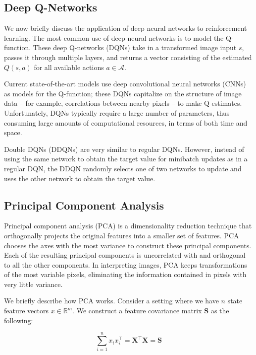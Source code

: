 \documentclass[11pt]{article}
\begin{document}
\subsection{Deep Q-Networks}

We now briefly discuss the application of deep neural networks to reinforcement learning. The most common use of deep neural networks is to model the Q-function. These deep Q-networks (DQNs) take in a transformed image input $s$, passes it through multiple layers, and returns a vector consisting of the estimated $Q(s, a)$ for all available actions $a \in \mathcal{A}$. 

Current state-of-the-art models \cite{mnih2013playing, mnih2015human} use deep convolutional neural networks (CNNs) as models for the Q-function; these DQNs capitalize on the structure of image data -- for example, correlations between nearby pixels -- to make Q estimates. Unfortunately, DQNs typically require a large number of parameters, thus consuming large amounts of computational resources, in terms of both time and space.

Double DQNs (DDQNs) \cite{van2016deep} are very similar to regular DQNs. However, instead of using the same network to obtain the target value for minibatch updates as in a regular DQN, the DDQN randomly selects one of two networks to update and uses the other network to obtain the target value.


\subsection{Principal Component Analysis}

Principal component analysis (PCA) is a dimensionality reduction technique that orthogonally projects the original features into a smaller set of features. PCA chooses the axes with the most variance to construct these principal components. Each of the resulting principal components is uncorrelated with and orthogonal to all the other components. In interpreting images, PCA keeps transformations of the most variable pixels, eliminating the information contained in pixels with very little variance.


We briefly describe how PCA works. Consider a setting where we have $n$ state feature vectors $x \in \mathbb{R}^m$. We construct a feature covariance matrix $\mathbf{S}$ as the following:

$$\sum_{i=1}^n x_i x_i^\top = \mathbf{X}^\top \mathbf{X} = \mathbf{S}$$
\end{document}
